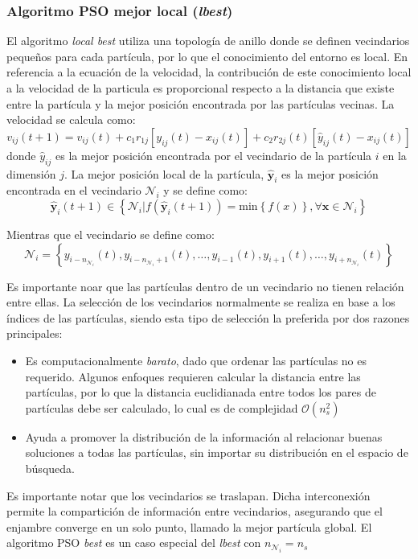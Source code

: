 \documentclass{article}
\begin{document}
\subsubsection{Algoritmo PSO mejor local (\emph{lbest})} 
El algoritmo \emph{local best} utiliza una topología de anillo donde se definen vecindarios pequeños para cada partícula, por lo que el conocimiento del entorno es local.
En referencia a la ecuación de la velocidad, la contribución de este conocimiento local a la velocidad de la particula es proporcional respecto a la distancia que existe entre la partícula y la mejor posición encontrada por las partículas vecinas.
La velocidad se calcula como:
\begin{equation}
	v_{ij}(t+1)=v_{ij}(t) + c_1 r_{1j}[y_{ij}(t) - x_{ij}(t)] + c_2 r_{2j}(t) [\hat{y}_{ij}(t) - x_{ij}(t)]
	\label{eq:velocidad-lbest}
\end{equation}
donde $\hat{y}_{ij}$ es la mejor posición encontrada por el vecindario de la partícula $i$ en la dimensión $j$.
La mejor posición local de la partícula, $\mathbf{\hat{y}}_i$ es la mejor posición encontrada en el vecindario $\mathcal{N}_i$ y se define como:
$$
\mathbf{\hat{y}}_i (t+1) \in \left \{ \mathcal{N}_i | f( \mathbf{\hat{y}}_i (t+1) ) = \text{min} \left \{ f(x) \right \}, \forall \mathbf{x} \in \mathcal{N}_i \right \}
$$

Mientras que el vecindario se define como:
$$
\mathcal{N}_i = \left \{ y_{{i-n}_{\mathcal{N}_i}}(t), y_{i-n_{\mathcal{N}_i}+1 }(t), \ldots, y_{i-1}(t), y_{i+1}(t), \ldots, y_{i+n_{\mathcal{N}_i} }(t) \right \}
$$

Es importante noar que las partículas dentro de un vecindario no tienen relación entre ellas.
La selección de los vecindarios normalmente se realiza en base a los índices de las partículas, siendo esta tipo de selección la preferida por dos razones principales:
\begin{itemize}
	\item Es computacionalmente \emph{barato}, dado que ordenar las partículas no es requerido. 
	Algunos enfoques requieren calcular la distancia entre las partículas, por lo que la distancia euclidianada entre todos los pares de partículas debe ser calculado, lo cual es de complejidad $\mathcal{O}(n_s^2)$
	\item Ayuda a promover la distribución de la información al relacionar buenas soluciones a todas las partículas, sin importar su distribución en el espacio de búsqueda.
\end{itemize}
Es importante notar que los vecindarios se traslapan.
Dicha interconexión permite la compartición de información entre vecindarios, asegurando que el enjambre converge en un solo punto, llamado la mejor partícula global.
El algoritmo PSO \emph{best} es un caso especial del \emph{lbest} con $n_{\mathcal{N}_i} = n_s$
\end{document}
